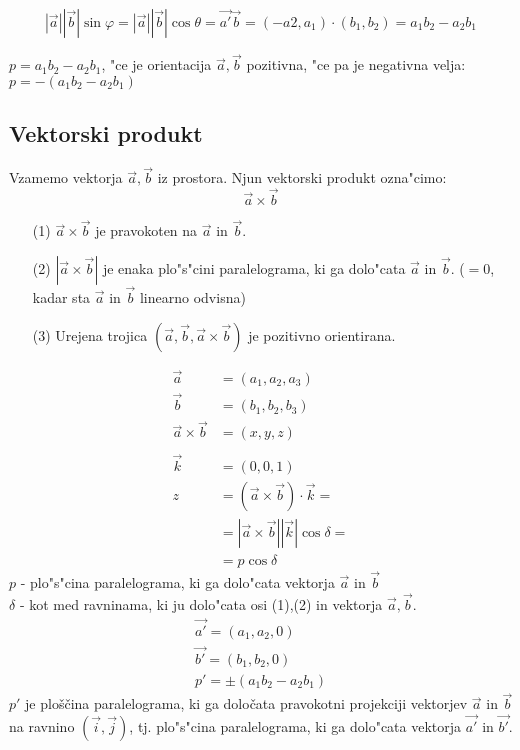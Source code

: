 \[|\vec{a}||\vec{b}| \sin\varphi = |\vec{a}||\vec{b}|\cos\theta = \vec{a'}\vec{b} = (-a2, a_1) \cdot (b_1, b_2) = a_1b_2 - a_2b_1\]

\(p = a_1b_2 - a_2b_1\), "ce je orientacija \(\vec{a}, \vec{b}\) pozitivna, "ce pa je negativna velja: \(p = -(a_1b_2 - a_2b_1)\)

\subsection{Vektorski produkt}
Vzamemo vektorja $\vec{a}, \vec{b}$ iz prostora. Njun vektorski produkt ozna"cimo:
$$\vec{a} \times \vec{b}$$
\begin{enumerate}
	\item[(1)] $\vec{a} \times \vec{b}$ je pravokoten na $\vec{a}$ in $\vec{b}$.
	\item[(2)] $|\vec{a} \times \vec{b}|$ je enaka plo"s"cini paralelograma, ki ga dolo"cata $\vec{a}$ in $\vec{b}$. ($=0$, kadar sta $\vec{a}$ in $\vec{b}$ linearno odvisna)
	\item[(3)] Urejena trojica $(\vec{a}, \vec{b}, \vec{a} \times \vec{b})$ je pozitivno orientirana.
\end{enumerate}
\begin{align*}
	\vec{a} &= (a_1, a_2, a_3)\\
	\vec{b} &= (b_1, b_2, b_3)\\
	\vec{a} \times \vec{b} &= (x, y, z)	\\\\
	\vec{k} &= (0, 0, 1)\\
	z &= (\vec{a} \times \vec{b}) \cdot \vec{k} =\\
	&=|\vec{a}\times \vec{b}| |\vec{k}| \cos \delta =\\
	&=p \cos \delta	
\end{align*}
$p$ - plo"s"cina paralelograma, ki ga dolo"cata vektorja $\vec{a}$ in $\vec{b}$\\
$\delta$ - kot med ravninama, ki ju dolo"cata osi (1),(2) in vektorja $\vec{a}, \vec{b}$.
\begin{align*}
	\vec{a'} = (a_1, a_2, 0)\\
	\vec{b'} = (b_1, b_2, 0)\\
	p' = \pm (a_1b_2 - a_2b_1)
\end{align*}
$p'$ je ploščina paralelograma, ki ga določata pravokotni projekciji vektorjev $\vec{a}$ in $\vec{b}$ na ravnino $(\vec{i}, \vec{j})$, tj. plo"s"cina paralelograma, ki ga dolo"cata vektorja $\vec{a'}$ in $\vec{b'}$.

